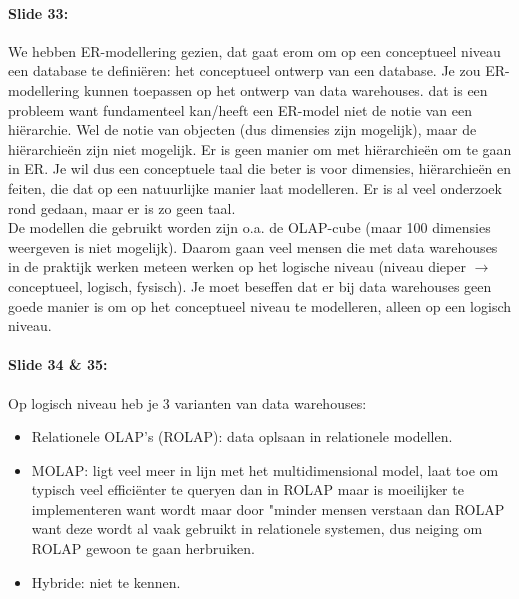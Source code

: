 \documentclass[10pt,a4paper]{report}
\begin{document}
\paragraph{Slide 33:}We hebben ER-modellering gezien, dat gaat erom om op een conceptueel niveau een database te definiëren: het conceptueel ontwerp van een database. Je zou ER-modellering kunnen toepassen op het ontwerp van data warehouses. dat is een probleem want fundamenteel kan/heeft een ER-model niet de notie van een hi\"erarchie. Wel de notie van objecten (dus dimensies zijn mogelijk), maar de hi\"erarchieën zijn niet mogelijk. Er is geen manier om met hi\"erarchieën om te gaan in ER. Je wil dus een conceptuele taal die beter is voor dimensies, hi\"erarchie\"en en feiten, die dat op een natuurlijke manier laat modelleren. Er is al veel onderzoek rond gedaan, maar er is zo geen taal.\\
De modellen die gebruikt worden zijn o.a. de OLAP-cube (maar 100 dimensies weergeven is niet mogelijk). Daarom gaan veel mensen die met data warehouses in de praktijk werken meteen werken op het logische niveau (niveau dieper $\rightarrow$ conceptueel, logisch, fysisch). Je moet beseffen dat er bij data warehouses geen goede manier is om op het conceptueel niveau te modelleren, alleen op een logisch niveau. 

\paragraph{Slide 34 \& 35:}Op logisch niveau heb je 3 varianten van data warehouses:
\begin{itemize} 
\item Relationele OLAP's (ROLAP): data oplsaan in relationele modellen.
\item MOLAP: ligt veel meer in lijn met het multidimensional model, laat toe om typisch veel effici\"enter te queryen dan in ROLAP maar is moeilijker te implementeren want wordt maar door "minder mensen verstaan dan ROLAP want deze wordt al vaak gebruikt in relationele systemen, dus neiging om ROLAP gewoon te gaan herbruiken.
\item Hybride: niet te kennen.
\end{itemize}
\end{document}
